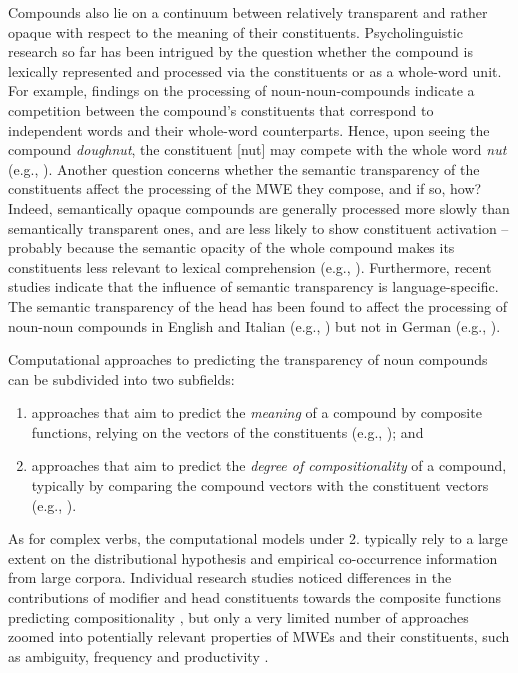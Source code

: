 \documentclass[output=paper]{langsci/langscibook}
\begin{document}
Compounds also lie on a continuum between relatively transparent and
rather opaque with respect to the meaning of their constituents.
Psycholinguistic research so far has been intrigued by the question
whether the compound is lexically represented and processed via the
constituents or as a whole-word unit. For example, findings on the
processing of noun-noun-compounds indicate a competition between the
compound’s constituents that correspond to independent words and their
whole-word counterparts. Hence, upon seeing the compound
\textit{doughnut}, the constituent [nut] may compete with the whole
word \textit{nut} (e.g., \citealt{Libben:06, FrissonEtAl:08,
  MonahanEtAl:08, Fiorentino/FundReznicek:09, Gagne/Spalding:09,
  Gagne/Spalding:14, Libben:14}). Another question concerns whether
the semantic transparency of the constituents affect the processing of
the MWE they compose, and if so, how? Indeed, semantically opaque
compounds are generally processed more slowly than semantically
transparent ones, and are less likely to show constituent activation –
probably because the semantic opacity of the whole compound makes its
constituents less relevant to lexical comprehension (e.g.,
\citealt{Taft/Forster:76, Sandra:94, Zwitserlood:94, IselEtAl:03,
  LibbenEtAl:03}). Furthermore, recent studies indicate that the
influence of semantic transparency is language-specific. The semantic
transparency of the head has been found to affect the processing of
noun-noun compounds in English and Italian (e.g.,
\citealt{MarelliEtAl:09, Marelli/Luzzatti:12}) but not in German (e.g.,
\citealt{Smolka/Libben:17}).

Computational approaches to predicting the transparency of noun
compounds can be subdivided into two subfields:
\begin{enumerate}
\item approaches that
aim to predict the \textit{meaning} of a compound by composite
functions, relying on the vectors of the constituents (e.g.,
\citealt{Mitchell/Lapata:10,CoeckeEtAl:11,BaroniEtAl:14b,Hermann:14}); and
\item approaches that aim to predict the \textit{degree of
  compositionality} of a compound, typically by comparing the compound
vectors with the constituent vectors (e.g.,
\citealt{ReddyEtAl:11a,Salehi/Cook:13,SchulteImWaldeEtAl:13,SalehiEtAl:14,SalehiEtAl:14b,SalehiEtAl:15,SchulteImWaldeEtAl:16b,Koeper/SchulteImWalde:17b}).
\end{enumerate}

As for complex verbs, the computational models under 2. typically rely to a large
extent on the distributional hypothesis and empirical co-occurrence
information from large corpora. Individual research studies noticed
differences in the contributions of modifier and head constituents
towards the composite functions predicting compositionality
\citep{ReddyEtAl:11a,SchulteImWaldeEtAl:13}, but only a very limited
number of approaches zoomed into potentially relevant properties of
MWEs and their constituents, such as ambiguity, frequency and
productivity \citep{Bell/Schaefer:16,SchulteImWaldeEtAl:16b}.
\end{document}
